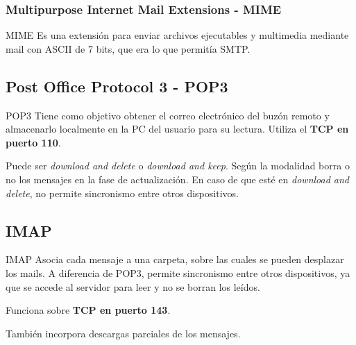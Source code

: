\subsubsection{Multipurpose Internet Mail Extensions - MIME}

\begin{definicion}{MIME}
    Es una extensión para enviar archivos ejecutables y multimedia mediante mail con ASCII de 7 bits, que era lo que permitía SMTP.
\end{definicion}


\subsection{Post Office Protocol 3 - POP3}

\begin{definicion}{POP3}
    Tiene como objetivo obtener el correo electrónico del buzón remoto y almacenarlo localmente en la PC del usuario para su lectura. Utiliza el \textbf{TCP en puerto 110}. 
\end{definicion}

Puede ser \emph{download and delete} o \emph{download and keep}. Según la modalidad borra o no los mensajes en la fase de actualización. En caso de que esté en \emph{download and delete}, no permite sincronismo entre otros dispositivos. 

\subsection{IMAP}

\begin{definicion}{IMAP}
    Asocia cada mensaje a una carpeta, sobre las cuales se pueden desplazar los mails. A diferencia de POP3, permite sincronismo entre otros dispositivos, ya que se accede al servidor para leer y no se borran los leídos.
    
    Funciona sobre \textbf{TCP en puerto 143}.
\end{definicion}

También incorpora descargas parciales de los mensajes. 